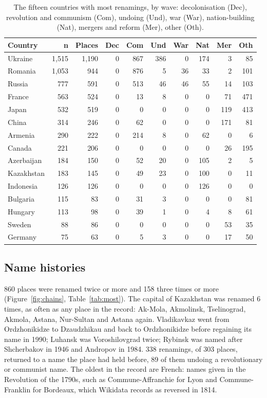 \documentclass[11pt,a4paper]{article}
\begin{document}
\begin{table}[tbp]\centering\footnotesize\caption{The fifteen countries with most renamings, by wave: decolonisation (Dec), revolution and communism (Com), undoing (Und), war (War), nation-building (Nat), mergers and reform (Mer), other (Oth).}\label{tab:countries}\begin{tabular}{lrrrrrrrrr}\toprule Country & n & Places & Dec & Com & Und & War & Nat & Mer & Oth\\\midrule
Ukraine & 1,515 & 1,190 & 0 & 867 & 386 & 0 & 174 & 3 & 85\\
Romania & 1,053 & 944 & 0 & 876 & 5 & 36 & 33 & 2 & 101\\
Russia & 777 & 591 & 0 & 513 & 46 & 46 & 55 & 14 & 103\\
France & 563 & 524 & 0 & 13 & 8 & 0 & 0 & 71 & 471\\
Japan & 532 & 519 & 0 & 0 & 0 & 0 & 0 & 119 & 413\\
China & 314 & 246 & 0 & 62 & 0 & 0 & 0 & 171 & 81\\
Armenia & 290 & 222 & 0 & 214 & 8 & 0 & 62 & 0 & 6\\
Canada & 221 & 206 & 0 & 0 & 0 & 0 & 0 & 26 & 195\\
Azerbaijan & 184 & 150 & 0 & 52 & 20 & 0 & 105 & 2 & 5\\
Kazakhstan & 183 & 145 & 0 & 49 & 23 & 0 & 100 & 0 & 11\\
Indonesia & 126 & 126 & 0 & 0 & 0 & 0 & 126 & 0 & 0\\
Bulgaria & 115 & 83 & 0 & 31 & 3 & 0 & 0 & 0 & 81\\
Hungary & 113 & 98 & 0 & 39 & 1 & 0 & 4 & 8 & 61\\
Sweden & 88 & 86 & 0 & 0 & 0 & 0 & 0 & 53 & 35\\
Germany & 75 & 63 & 0 & 5 & 3 & 0 & 0 & 17 & 50\\
\bottomrule\end{tabular}\end{table}

\subsection{Name histories}
860 places were renamed twice or more and 158 three times or more (Figure~\ref{fig:chains}, Table~\ref{tab:most}). The capital of Kazakhstan was renamed 6 times, as often as any place in the record: Ak-Mola, Akmolinsk, Tselinograd, Akmola, Astana, Nur-Sultan and Astana again. Vladikavkaz went from Ordzhonikidze to Dzaudzhikau and back to Ordzhonikidze before regaining its name in 1990; Luhansk was Voroshilovgrad twice; Rybinsk was named after Shcherbakov in 1946 and Andropov in 1984. 338 renamings, of 303 places, returned to a name the place had held before, 89 of them undoing a revolutionary or communist name. The oldest in the record are French: names given in the Revolution of the 1790s, such as Commune-Affranchie for Lyon and Commune-Franklin for Bordeaux, which Wikidata records as reversed in 1814.
\end{document}
